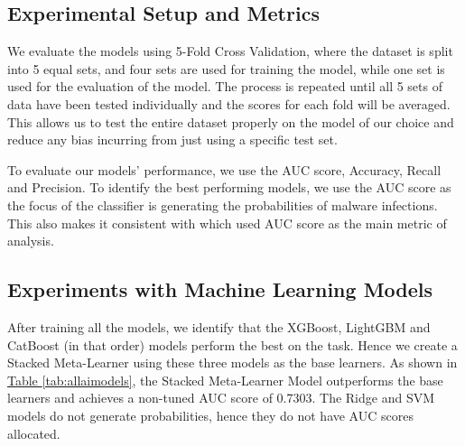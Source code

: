 \documentclass[pdflatex,sn-basic,10pt]{sn-jnl}%
\newcommand{\reftable}[1]{\hyperref[#1]{Table \ref*{#1}}}
\begin{document}
\subsection{Experimental Setup and Metrics}\label{subsec:experimental-setup-and-metrics}

We evaluate the models using 5-Fold Cross Validation, where the dataset is split into 5 equal sets, and four sets are used for training the model, while one set is used for the evaluation of the model. The process is repeated until all 5 sets of data have been tested individually and the scores for each fold will be averaged. This allows us to test the entire dataset properly on the model of our choice and reduce any bias incurring from just using a specific test set.

To evaluate our models' performance, we use the AUC score, Accuracy, Recall and Precision. To identify the best performing models, we use the AUC score as the focus of the classifier is generating the probabilities of malware infections. This also makes it consistent with \cite{microsoft-malware-prediction} which used AUC score as the main metric of analysis.


\subsection{Experiments with Machine Learning Models}\label{subsec:experiments-with-machine-learning-models}
After training all the models, we identify that the XGBoost, LightGBM and CatBoost (in that order) models perform the best on the task. Hence we create a Stacked Meta-Learner using these three models as the base learners. As shown in \reftable{tab:allaimodels}, the Stacked Meta-Learner Model outperforms the base learners and achieves a non-tuned AUC score of 0.7303. The Ridge and SVM models do not generate probabilities, hence they do not have AUC scores allocated.
\end{document}
